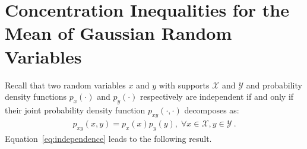 \documentclass[11pt]{article}
\newcommand{\calX}{\mathcal{X}}
\begin{document}
\section{Concentration Inequalities for the Mean of Gaussian Random Variables}

Recall that two random variables $x$ and $y$ with supports $\calX$ and $\mathcal{Y}$ and probability density functions $p_x(\cdot)$ and $p_y(\cdot)$ respectively are independent if and only if their joint probability density function $p_{xy}(\cdot,\cdot)$ decomposes as:
\begin{align}
    \label{eq:independence}
    p_{xy}(x, y) = p_x(x) p_y(y),\; \forall x \in \calX, y \in \mathcal{Y}~.
\end{align}
Equation~\eqref{eq:independence} leads to the following result.
\end{document}
